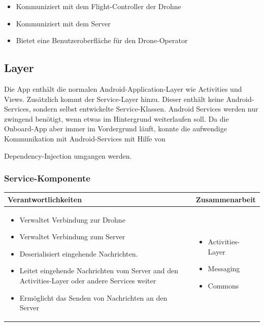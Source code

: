 \begin{itemize}
	\item Kommuniziert mit dem \Gls{Flight-Controller} der Drohne
	\item Kommuniziert mit dem Server
	\item Bietet eine Benutzeroberfläche für den Drone-Operator 
\end{itemize}

\subsection{Layer}

Die App enthält die normalen Android-Application-Layer wie Activities und Views. Zusätzlich kommt der Service-Layer hinzu. Dieser enthält keine Android-Services, sondern selbst entwickelte Service-Klassen. Android Services werden nur zwingend benötigt, wenn etwas im Hintergrund weiterlaufen soll. Da die Onboard-App aber immer im Vordergrund läuft, konnte die aufwendige Kommunikation mit Android-Services mit Hilfe von {Dependency-Injection \cite{DI} umgangen werden.\\

\subsubsection{Service-Komponente}

\begin{tabular}{|p{}|p{}|} \hline
	\textbf{Verantwortlichkeiten} & \textbf{Zusammenarbeit} \\ \hline \hline
	
	\begin{itemize}
		\item Verwaltet Verbindung zur Drohne
		\item Verwaltet Verbindung zum Server
		\item Deserialisiert eingehende Nachrichten.
		\item Leitet eingehende Nachrichten vom Server and den Activities-Layer oder andere Services weiter
		\item Ermöglicht das Senden von Nachrichten an den Server
	\end{itemize}&
	\begin{itemize}
		\item Activities-Layer
		\item Messaging
		\item Commons
	\end{itemize}
	\\ \hline
\end{tabular}


}
